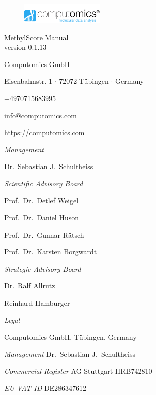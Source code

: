 \thispagestyle{empty}

\begin{figure}
\hfill \includegraphics[width=0.35\textwidth]{graphics/logo2013-latex-2400ppi.png}
\end{figure}

\vspace*{70mm}


\begin{center}
\begin{LARGE}

MethylScore Manual\\
{\large version 0.1.13+}\\[50pt]

\end{LARGE}

\end{center}
\vfill
\restoregeometry

\newpage


Computomics GmbH

Eisenbahnstr. 1 $\cdot$ 72072 T\"ubingen $\cdot$ Germany

\bigskip
+4970715683995

\href{mailto:info@computomics.com}{info@computomics.com}

\href{https://computomics.com}{https://computomics.com}

\bigskip
{\em Management}

Dr.\ Sebastian J.\ Schultheiss

\bigskip
{\em Scientific Advisory Board}

Prof.\ Dr.\ Detlef Weigel

Prof.\ Dr.\ Daniel Huson

Prof.\ Dr.\ Gunnar R\"atsch

Prof.\ Dr.\ Karsten Borgwardt

\bigskip
{\em Strategic Advisory Board}

Dr.\ Ralf Allrutz

Reinhard Hamburger

\vfill
{\em Legal}

Computomics GmbH, T\"ubingen, Germany

{\em Management} Dr.\ Sebastian J.\ Schultheiss

{\em Commercial Register} AG Stuttgart HRB742810

{\em EU VAT ID} DE286347612

\newpage
